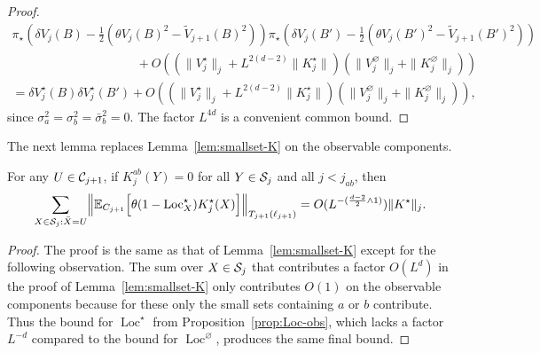 \documentclass[11pt]{amsart}
\numberwithin{equation}{section}
\numberwithin{theorem}{section}
\newcommand{\1}{{\bf 1}}
\newcommand{\obs}{\star}
\newcommand{\Vbulk}{V^\varnothing}
\newcommand{\Vobs}{V^\obs}
\newcommand{\Kbulk}{K^\varnothing}
\newcommand{\Kobs}{K^\obs}
\newcommand{\dplus}{(\frac{d-2}{2} \wedge 1)}
\newcommand{\Loc}{\operatorname{Loc}}
\begin{document}
\begin{proof}
  \begin{multline}
    \pi_\obs
    (\delta V_j(B) -\frac12 (\theta V_j(B)^2-\tilde V_{j+1}(B)^2))
    \pi_\obs (\delta V_j(B') -\frac12 (\theta V_j(B')^2-\tilde V_{j+1}(B')^2))
    \\
    \qquad\qquad\qquad\qquad\qquad +
    O((\|\Vobs_{j}\|_{j}+L^{2(d-2)}\|\Kobs_{j}\|)(\|\Vbulk_j\|_j+
    \|\Kbulk_j\|_j))
    \\ =
    \delta \Vobs_j(B)
    \delta \Vobs_j(B') 
    +
    O((\|\Vobs_{j}\|_{j}+L^{2(d-2)}\|\Kobs_{j}\|)(\|\Vbulk_j\|_j+
    \|\Kbulk_j\|_j)),
  \end{multline}
  since $\sigma_a^2=\sigma_b^2=\bar{\sigma}_b^2=0$. The factor $L^{4d}$ is a convenient  common bound.
\end{proof}

The next lemma replaces Lemma~\ref{lem:smallset-K} on the observable components.
\begin{lemma} \label{lem:smallset-Kobs}
  For any $U \in \mathcal C_{j+1}$,  if $K^{ab}_{j}(Y)=0$ for all $Y\in
    \mathcal S_j$ and all $j<j_{ab}$, then 
  \begin{equation}
    \sum_{X \in \cS_j: \bar X=U} \normB{ \E_{C_{j+1}}\qB{\theta (1-\Loc_X^\obs) \Kobs _{j} (X)}}_{T_{j+1}(\ell_{j+1})} = O(L^{-\dplus}) \|\Kobs\|_j.
  \end{equation}
\end{lemma}

\begin{proof}
  The proof is the same as that of Lemma~\ref{lem:smallset-K} except
  for the following observation.  The sum over $X \in \mathcal S_j$ that
  contributes a factor $O(L^d)$ in the proof of
  Lemma~\ref{lem:smallset-K} only contributes $O(1)$ on the observable
  components because for these only the small sets containing $a$ or
  $b$ contribute.  Thus the bound for $\Loc^\obs$ from
  Proposition~\ref{prop:Loc-obs}, which lacks a factor $L^{-d}$
  compared to the bound for $\Loc^\varnothing$, produces the same
  final bound.
\end{proof}
\end{document}

